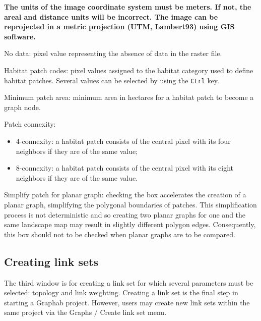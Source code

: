 \documentclass{article}
\begin{document}
{\bfseries The units of the image coordinate system must be meters. If not, the areal and distance units will be incorrect. The image can be reprojected in a metric projection (UTM, Lambert93) using GIS software.}

No data: pixel value representing the absence of data in the raster
file.

Habitat patch codes: pixel values assigned to the habitat category used to define habitat patches.  
Several values can be selected by using the \verb|Ctrl| key.


Minimum patch area: minimum area in hectares for a habitat patch to become a graph node.  

Patch connexity:
\begin{itemize}
	\item 4-connexity: a habitat patch consists of the central pixel with its four neighbors if they are of the same value;
	\item 8-connexity: a habitat patch consists of the central pixel with its eight neighbors if they are of the same value.
\end{itemize}

Simplify patch for planar graph: checking the box accelerates the creation of a planar graph, simplifying the polygonal boundaries of patches. This simplification process is not deterministic and so creating two planar graphs for one and the same landscape map may result in slightly different polygon edges. Consequently, this box should not to be checked when planar graphs are to be compared. 

\subsection{Creating link sets}
\label{linkset}
The third window is for creating a link set for which several parameters must be selected: topology and link weighting. Creating a link set is the final step in starting a Graphab project. However, users may create new link sets within the same project via the Graphs / Create link set menu.
\end{document}

